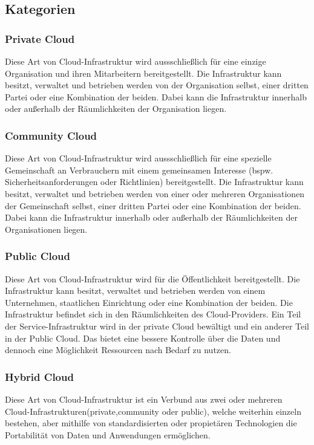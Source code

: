 \subsection{Kategorien}
\subsubsection{Private Cloud}
Diese Art von Cloud-Infrastruktur wird aussschließlich für eine einzige Organisation und ihren Mitarbeitern bereitgestellt. Die Infrastruktur kann besitzt, verwaltet und betrieben werden von der Organisation selbst, einer dritten Partei oder eine Kombination der beiden. Dabei kann die Infrastruktur innerhalb oder außerhalb der Räumlichkeiten der Organisation liegen\cite{nist_definition}.

\subsubsection{Community Cloud}
Diese Art von Cloud-Infrastruktur wird aussschließlich für eine spezielle Gemeinschaft an Verbrauchern mit einem gemeinsamen Interesse (bspw. Sicherheitsanforderungen oder Richtlinien) bereitgestellt. Die Infrastruktur kann besitzt, verwaltet und betrieben werden von einer oder mehreren Organisationen der Gemeinschaft selbst, einer dritten Partei oder eine Kombination der beiden. Dabei kann die Infrastruktur innerhalb oder außerhalb der Räumlichkeiten der Organisationen liegen\cite{nist_definition}.

\subsubsection{Public Cloud}
Diese Art von Cloud-Infrastruktur wird für die Öffentlichkeit bereitgestellt. Die Infrastruktur kann besitzt, verwaltet und betrieben werden von einem Unternehmen, staatlichen Einrichtung oder eine Kombination der beiden. Die Infrastruktur befindet sich in den Räumlichkeiten des Cloud-Providers\cite{nist_definition}. Ein Teil der Service-Infrastruktur wird in der private Cloud bewältigt und ein anderer Teil in der Public Cloud. Das bietet eine bessere Kontrolle über die Daten und dennoch eine Möglichkeit Ressourcen nach Bedarf zu nutzen\cite{study_cc_cdb}.

\subsubsection{Hybrid Cloud}
Diese Art von Cloud-Infrastruktur ist ein Verbund aus zwei oder mehreren Cloud-Infrastrukturen(private,community oder public), welche weiterhin einzeln bestehen, aber mithilfe von standardisierten oder propietären Technologien die Portabilität von Daten und Anwendungen ermöglichen\cite{nist_definition}.


